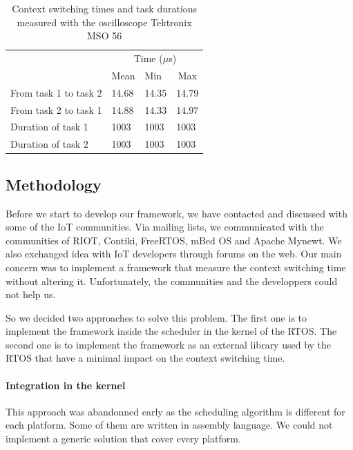 \begin{table}[!ht]
  \centering
  \begin{tabular}{llll}
                        & \multicolumn{3}{c}{Time ($\mu$s)}                              \\ \cline{2-4} 
                        & \multicolumn{1}{c}{Mean} & Min   & \multicolumn{1}{c}{Max} \\ \cline{2-4} 
  From task 1 to task 2 & 14.68                    & 14.35 & 14.79                   \\
  From task 2 to task 1 & 14.88                    & 14.33 & 14.97                   \\
  Duration of task 1    & 1003                     & 1003  & 1003                    \\
  Duration of task 2    & 1003                     & 1003  & 1003                   
  \end{tabular}
  \caption{Context switching times and task durations measured with the oscilloscope Tektronix MSO 56}
  \label{tab:reference-measurement}
\end{table}


\subsection{Methodology}

Before we start to develop our framework, we have contacted and discussed with some of the IoT communities.
Via mailing lists, we communicated with the communities of RIOT, Contiki, FreeRTOS, mBed OS and Apache Mynewt.
We also exchanged idea with IoT developers through forums on the web.
Our main concern was to implement a framework that measure the context switching time without altering it.
Unfortunately, the communities and the developpers could not help us.

So we decided two approaches to solve this problem.
The first one is to implement the framework inside the scheduler in the kernel of the RTOS.
The second one is to implement the framework as an external library used by the RTOS that have a minimal impact on the context switching time.

\paragraph{Integration in the kernel}
This approach was abandonned early as the scheduling algorithm is different for each platform.
Some of them are written in assembly language.
We could not implement a generic solution that cover every platform.

